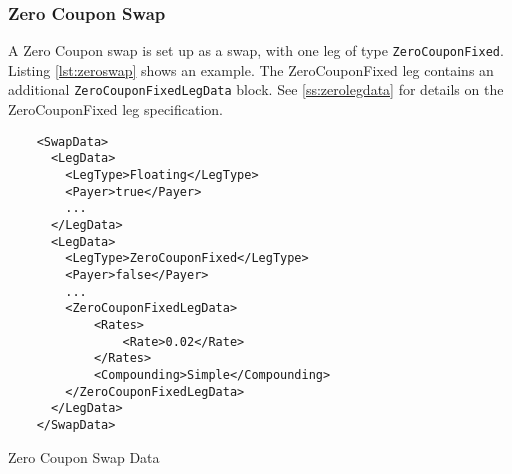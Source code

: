 \subsubsection{Zero Coupon Swap}

A Zero Coupon swap is set up as a swap, with one leg of type {\tt ZeroCouponFixed}. Listing \ref{lst:zeroswap} shows an
example. The ZeroCouponFixed leg contains an additional {\tt ZeroCouponFixedLegData} block. See \ref{ss:zerolegdata} for details on the ZeroCouponFixed leg
specification.

\begin{listing}[H]
\begin{verbatim}
    <SwapData>
      <LegData>
        <LegType>Floating</LegType>
        <Payer>true</Payer>
        ...
      </LegData>
      <LegData>
        <LegType>ZeroCouponFixed</LegType>
        <Payer>false</Payer>
        ...
        <ZeroCouponFixedLegData>
            <Rates>
                <Rate>0.02</Rate>
            </Rates>
            <Compounding>Simple</Compounding>
        </ZeroCouponFixedLegData>
      </LegData>
    </SwapData>
\end{verbatim}
\caption{Zero Coupon Swap Data}
\label{lst:zeroswap}
\end{listing}
